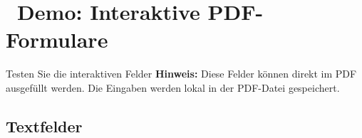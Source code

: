 \newpage
\section*{\textcolor{ctmmBlue}{\faEdit~Demo: Interaktive PDF-Formulare}}
\label{sec:demo-interactive}

\begin{ctmmBlueBox}{Testen Sie die interaktiven Felder}
\textbf{Hinweis:} Diese Felder können direkt im PDF ausgefüllt werden. Die Eingaben werden lokal in der PDF-Datei gespeichert.
\end{ctmmBlueBox}

\vspace{1cm}

\subsection*{Textfelder}
